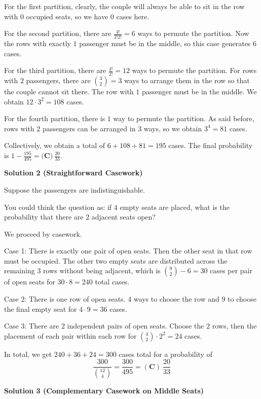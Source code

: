 \begin{enumerate}
 
For the first partition, clearly, the couple will always be able to sit in the row with $0$ occupied seats, so we have $0$ cases here.

 
For the second partition, there are $\frac{4!}{2!2!} = 6$ ways to permute the partition. Now the rows with exactly $1$ passenger must be in the middle, so this case generates $6$ cases.

 
For the third partition, there are $\frac{4!}{2!} = 12$ ways to permute the partition. For rows with $2$ passengers, there are $\binom{3}{2} = 3$ ways to arrange them in the row so that the couple cannot sit there. The row with $1$ passenger must be in the middle. We obtain $12 \cdot 3^2 = 108$ cases.

 
For  the fourth partition, there is $1$ way to permute the partition. As said before, rows with $2$ passengers can be arranged in $3$ ways, so we obtain $3^4 = 81$ cases.

 
Collectively, we obtain a total of $6 + 108 + 81 = 195$ cases. The final probability is $1 - \frac{195}{495} = \boxed{\textbf{(C)}~\frac{20}{33}}$.

 



\textbf{Solution 2 (Straightforward Casework)}

Suppose the passengers are indistinguishable. 

 You could think the question as: if 4 empty seats are placed, what is the probability that there are 2 adjacent seats open?

 We proceed by casework.

 
Case 1: There is exactly one pair of open seats. Then the other seat in that row must be occupied. The other two empty seats are distributed across the remaining $3$ rows without being adjacent, which is $\binom{9}{2}-6=30$ cases per pair of open seats for $30\cdot8=240$ total cases. 

 
Case 2: There is one row of open seats. $4$ ways to choose the row and $9$ to choose the final empty seat for $4\cdot9=36$ cases. 

 
Case 3: There are $2$ independent pairs of open seats. Choose the $2$ rows, then the placement of each pair within each row for $\binom{4}{2}\cdot2^2=24$ cases. 

 
In total, we get $240+36+24=300$ cases total for a probability of
 \[\frac{300}{\binom{12}{4}}=\frac{300}{495}=\boxed{\mathbf{(C)}~\frac{20}{33}}\]




\textbf{Solution 3 (Complementary Casework on Middle Seats)}


\end{enumerate}
